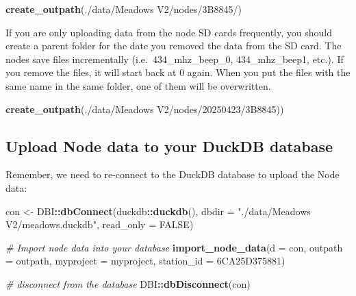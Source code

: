 \documentclass[
]{book}
\newenvironment{Shaded}{\begin{snugshade}}{\end{snugshade}}
\newcommand{\AttributeTok}[1]{\textcolor[rgb]{0.13,0.29,0.53}{#1}}
\newcommand{\CommentTok}[1]{\textcolor[rgb]{0.56,0.35,0.01}{\textit{#1}}}
\newcommand{\ConstantTok}[1]{\textcolor[rgb]{0.56,0.35,0.01}{#1}}
\newcommand{\FunctionTok}[1]{\textcolor[rgb]{0.13,0.29,0.53}{\textbf{#1}}}
\newcommand{\NormalTok}[1]{#1}
\newcommand{\OtherTok}[1]{\textcolor[rgb]{0.56,0.35,0.01}{#1}}
\newcommand{\SpecialCharTok}[1]{\textcolor[rgb]{0.81,0.36,0.00}{\textbf{#1}}}
\newcommand{\StringTok}[1]{\textcolor[rgb]{0.31,0.60,0.02}{#1}}
\begin{document}
\begin{Shaded}
\begin{Highlighting}[]
\FunctionTok{create\_outpath}\NormalTok{(}\StringTok{\textquotesingle{}./data/Meadows V2/nodes/3B8845/\textquotesingle{}}\NormalTok{)}
\end{Highlighting}
\end{Shaded}

If you are only uploading data from the node SD cards frequently, you should create a parent folder for the date you removed the data from the SD card. The nodes save files incrementally (i.e.~434\_mhz\_beep\_0, 434\_mhz\_beep1, etc.). If you remove the files, it will start back at 0 again. When you put the files with the same name in the same folder, one of them will be overwritten.

\begin{Shaded}
\begin{Highlighting}[]
\FunctionTok{create\_outpath}\NormalTok{(}\StringTok{\textquotesingle{}./data/Meadows V2/nodes/20250423/3B8845)\textquotesingle{}}\NormalTok{)}
\end{Highlighting}
\end{Shaded}

\subsection{Upload Node data to your DuckDB database}\label{upload-node-data-to-your-duckdb-database}

Remember, we need to re-connect to the DuckDB database to upload the Node data:

\begin{Shaded}
\begin{Highlighting}[]
\NormalTok{con }\OtherTok{\textless{}{-}}\NormalTok{ DBI}\SpecialCharTok{::}\FunctionTok{dbConnect}\NormalTok{(duckdb}\SpecialCharTok{::}\FunctionTok{duckdb}\NormalTok{(), }
                      \AttributeTok{dbdir =} \StringTok{"./data/Meadows V2/meadows.duckdb"}\NormalTok{, }
                      \AttributeTok{read\_only =} \ConstantTok{FALSE}\NormalTok{)}

\CommentTok{\# Import node data into your database}
\FunctionTok{import\_node\_data}\NormalTok{(}\AttributeTok{d =}\NormalTok{ con,}
                 \AttributeTok{outpath =}\NormalTok{ outpath,}
                 \AttributeTok{myproject =}\NormalTok{ myproject,}
                 \AttributeTok{station\_id =} \StringTok{\textquotesingle{}6CA25D375881\textquotesingle{}}\NormalTok{)}

\CommentTok{\# disconnect from the database}
\NormalTok{DBI}\SpecialCharTok{::}\FunctionTok{dbDisconnect}\NormalTok{(con)}
\end{Highlighting}
\end{Shaded}
\end{document}
